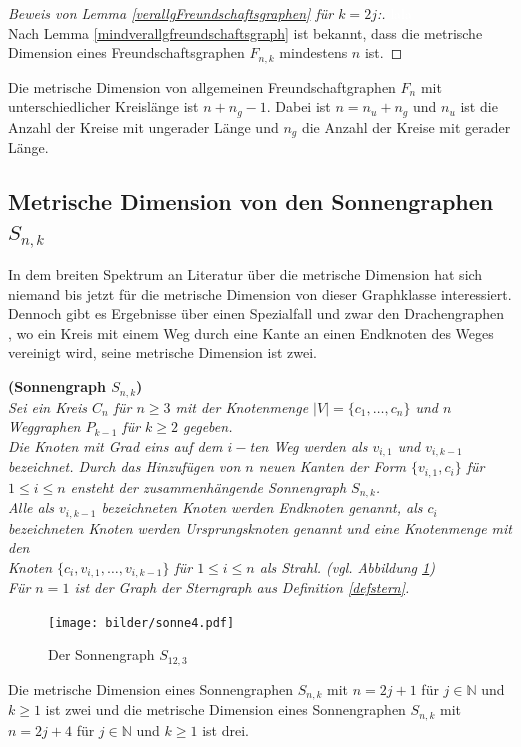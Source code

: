 \begin{proof}[Beweis von Lemma \ref{verallgFreundschaftsgraphen} für $k=2j$:] \vspace{+1mm}
\textcolor{white}{lala}\\ 
Nach Lemma \ref{mindverallgfreundschaftsgraph} ist bekannt, dass die metrische Dimension eines Freundschaftsgraphen $F_{n,k}$ mindestens $n$ ist. 
\end{proof}
\begin{lem}
Die metrische Dimension von allgemeinen Freundschaftgraphen $F_{n}$ mit unterschiedlicher Kreislänge ist $n+n_g-1$. Dabei ist $n=n_u+n_g$ und $n_u$ ist die Anzahl der Kreise mit ungerader Länge und $n_g$ die Anzahl der Kreise mit gerader Länge.
\end{lem}
\newpage
\subsection{Metrische Dimension von den Sonnengraphen $S_{n,k}$}
In dem breiten Spektrum an Literatur über die metrische Dimension hat sich niemand bis jetzt für die metrische Dimension von dieser Graphklasse interessiert. Dennoch gibt es Ergebnisse über einen Spezialfall und zwar den Drachengraphen \cite{blabla}, wo ein Kreis mit einem Weg durch eine Kante an einen Endknoten des Weges vereinigt wird, seine metrische Dimension ist zwei.

\begin{defi}{\textbf{(Sonnengraph $S_{n,k}$)}}\\
\emph{Sei ein Kreis $C_n$ für $n \geq 3$ mit der Knotenmenge $|V|=\{ c_1, \ldots , c_n \}$ und $n$ Weggraphen $P_{k-1}$ für $k\geq 2$ gegeben.\\Die Knoten mit Grad eins auf dem $i-$ten Weg werden als $v_{i,1}$ und $v_{i,k-1}$ bezeichnet. Durch das Hinzufügen von $n$ neuen Kanten der Form $\{v_{i,1},c_i\}$ für $1 \leq i \leq n$ ensteht der zusammenhängende Sonnengraph $S_{n,k}$.\\
Alle als $v_{i,k-1}$ bezeichneten Knoten werden Endknoten genannt, als $c_i$ bezeichneten Knoten werden Ursprungsknoten genannt und eine Knotenmenge mit den\\Knoten $\{c_i,v_{i,1}, \ldots ,v_{i,k-1}\}$ für $1 \leq i \leq n$ als Strahl. (vgl. Abbildung \ref{bild:sonnengraph})\\
Für $n=1$ ist der Graph der Sterngraph aus Definition \ref{defstern}.}
\end{defi}
\begin{figure}[h!]
\centering
 		 \texttt{[image: bilder/sonne4.pdf]}
   \caption{Der Sonnengraph $S_{12,3}$}
   \label{bild:sonnengraph}
\end{figure}
\begin{lem}
Die metrische Dimension eines Sonnengraphen $S_{n,k}$ mit $n = 2j+1$ für $j \in \mathbb{N}$ und $k \geq 1$ ist zwei und die metrische Dimension eines Sonnengraphen $S_{n,k}$ mit $n = 2j+4$ für $j \in \mathbb{N}$ und $k \geq 1$ ist drei. 
\end{lem}

